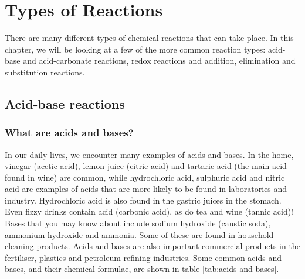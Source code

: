 \chapter{Types of Reactions}
\label{chap:reactiontypes}

There are many different types of chemical reactions that can take place. In this chapter, we will be looking at a few of the more common reaction types: acid-base and acid-carbonate reactions, redox reactions and addition, elimination and substitution reactions.


\section{Acid-base reactions}
\label{sec:reactiontypes:acid-base}

\subsection{What are acids and bases?}

In our daily lives, we encounter many examples of acids and bases. In the home, vinegar (acetic acid), lemon juice (citric acid) and tartaric acid (the main acid found in wine) are common, while hydrochloric acid, sulphuric acid and nitric acid are examples of acids that are more likely to be found in laboratories and industry. Hydrochloric acid is also found in the gastric juices in the stomach. Even fizzy drinks contain acid (carbonic acid), as do tea and wine (tannic acid)! Bases that you may know about include sodium hydroxide (caustic soda), ammonium hydroxide and ammonia. Some of these are found in household cleaning products. Acids and bases are also important commercial products in the fertiliser, plastics and petroleum refining industries. Some common acids and bases, and their chemical formulae, are shown in table \ref{tab:acids and bases}.

